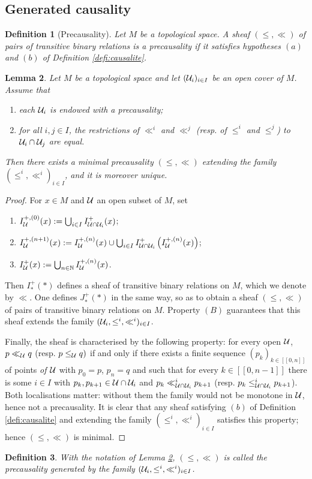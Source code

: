 \documentclass[a4paper,twoside]{article}
\providecommand{\lsem}{[\![}
\providecommand{\rsem}{]\!]}
\newtheorem{lem}{Lemma}[section]
\newtheorem{defi}[lem]{Definition}
\begin{document}
\subsection{Generated causality}
\begin{defi}[Precausality]\label{def:precausality}
Let $M$ be a topological space. A sheaf $(\leq,\ll)$ of pairs of transitive binary relations is a precausality if it satisfies hypotheses $(a)$ and $(b)$ of Definition \ref{defi:causalite}.
\end{defi}
\begin{lem}\label{lem:union_causalite} Let $M$ be a topological space and let $(\mathcal{U}_i)_{i\in I}$ be an open cover of $M$.
Assume that
\begin{enumerate}[label=(\Alph*)]
\item each $\mathcal{U}_i$ is endowed with a precausality;
\item for all $i,j\in I$, the restrictions of $\ll^i$ and $\ll^j$ (resp. of $\leq^i$ and $\leq^j$) to $\mathcal{U}_i\cap \mathcal{U}_j$ are equal.
\end{enumerate}
Then there exists a minimal precausality $(\leq,\ll)$ extending the family $(\leq^i,\ll^i)_{i\in I}$, and it is moreover unique.
\end{lem}
\begin{proof}
For $x\in M$ and $\mathcal{U}$ an open subset of $M$, set
\begin{enumerate}
\item $I^{+,(0)}_{\mathcal{U}}(x):=\bigcup_{i\in I} I^+_{\mathcal{U}\cap \mathcal{U}_i} (x)$;
\item $I^{+,(n+1)}_{\mathcal{U}}(x):=I^{+,(n)}_{\mathcal{U}}(x)\cup \bigcup_{i\in I} I^+_{\mathcal{U}\cap \mathcal{U}_i}\left(I^{+,(n)}_{\mathcal{U}}(x) \right)$;
\item $I^+_{\mathcal{U}}(x):=\bigcup_{n\in \mathbb{N}} I^{+,(n)}_{\mathcal{U}}(x) $.
\end{enumerate}
Then $I^+_{*}(*)$ defines a sheaf of transitive binary relations on $M$, which we denote by $\ll$.
One defines $J^+_{*}(*)$ in the same way, so as to obtain a sheaf $(\leq,\ll)$ of pairs of transitive binary relations on $M$.
Property $(B)$ guarantees that this sheaf extends the family $(\mathcal{U}_i,\leq^i,\ll^i)_{i\in I}$.

Finally, the sheaf is characterised by the following property: for every open $\mathcal{U}$,
$p\ll_{\mathcal{U}} q$ (resp. $p\leq_{\mathcal{U}} q)$ if and only if there exists a finite sequence
$(p_k)_{k\in \lsem 0,n\rsem}$ of points \emph{of $\mathcal{U}$} with $p_0=p$, $p_n=q$ and such that for every $k\in \lsem0,n-1 \rsem$ there is some $i\in I$ with
$p_k,p_{k+1}\in \mathcal{U}\cap \mathcal{U}_i$ and $p_k\ll^i_{\mathcal{U}\cap \mathcal{U}_i} p_{k+1}$ (resp. $p_k\leq^i_{\mathcal{U}\cap \mathcal{U}_i} p_{k+1}$).
Both localisations matter: without them the family would not be monotone in $\mathcal{U}$, hence not a precausality.
It is clear that any sheaf satisfying $(b)$ of Definition \ref{defi:causalite} and extending the family $(\leq^i,\ll^i)_{i\in I}$ satisfies this property; hence $(\leq,\ll)$ is minimal.
\end{proof}
\begin{defi}\label{def:precausality_generated_notation_lemma} With the notation of Lemma \ref{lem:union_causalite}, $(\leq,\ll)$ is called the precausality generated by the family $(\mathcal{U}_i,\leq^i,\ll^i)_{i\in I}$.
\end{defi}
\end{document}
